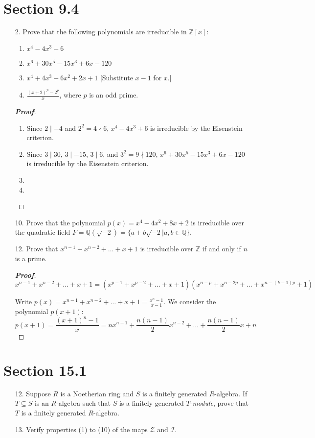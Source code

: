 \documentclass[12pt,leqno]{book}
\theoremstyle{definition}
\newcommand{\Z}{\mathbb{Z}}
\newcommand{\Q}{\mathbb{Q}}
\newenvironment{Proof}{\begin{proof}[\textnormal{\textbf{Proof}}]}{\end{proof}}
\begin{document}
\section*{Section 9.4}
\begin{enumerate}
 \item [2.] Prove that the following polynomials are irreducible in $\Z[x]$:
  \begin{enumerate}
   \item $x^4-4x^3+6$
   \item $x^6+30x^5-15x^3+6x-120$
   \item $x^4+4x^3+6x^2+2x+1$ [Substitute $x-1$ for $x$.]
   \item $\frac{(x+2)^p-2^p}{x}$, where $p$ is an odd prime.
  \end{enumerate}

\begin{Proof}\indent
 \begin{enumerate}
  \item Since $2\mid-4$ and $2^2=4\nmid6$, $x^4-4x^3+6$ is irreducible by the Eisenstein criterion.
  \item Since $3\mid30$, $3\mid-15$, $3\mid6$, and $3^2=9\nmid120$, $x^6+30x^5-15x^3+6x-120$ is irreducible by the Eisenstein criterion.
  \item 
  \item 
 \end{enumerate}

\end{Proof}

 \item [10.] Prove that the polynomial $p(x)=x^4-4x^2+8x+2$ is irreducible over the quadratic field $F=\Q(\sqrt{-2})=\{a+b\sqrt{-2}|a,b\in\Q\}$. 
 \item [12.] Prove that $x^{n-1}+x^{n-2}+\hdots+x+1$ is irreducible over $\Z$ if and only if $n$ is a prime.
  
\begin{Proof}
\[x^{n-1}+x^{n-2}+\hdots+x+1=\left(x^{p-1}+x^{p-2}+\hdots+x+1\right)\left(x^{n-p}+x^{n-2p}+\hdots+x^{n-(k-1)p}+1\right)\]

Write $p(x)=x^{n-1}+x^{n-2}+\hdots+x+1=\frac{x^n-1}{x-1}$. We consider the polynomial $p(x+1)$: \[p(x+1)=\frac{(x+1)^n-1}{x}=nx^{n-1}+\frac{n(n-1)}{2}x^{n-2}+\hdots+\frac{n(n-1)}{2}x+n\]
\end{Proof}

\end{enumerate}

\section*{Section 15.1}
\begin{enumerate}
 \item [12.] Suppose $R$ is a Noetherian ring and $S$ is a finitely generated $R$-algebra. If $T\subseteq S$ is an $R$-algebra such that $S$ is a finitely generated $T$-\textit{module}, prove that $T$ is a finitely generated $R$-algebra.  
 \item [13.] Verify properties (1) to (10) of the maps $\mathcal{Z}$ and $\mathcal{I}$.
\end{enumerate}
\end{document}
